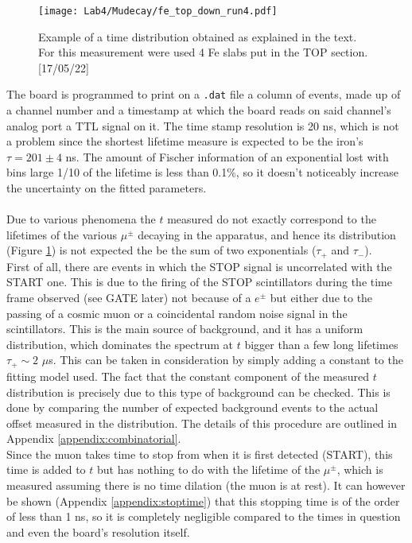\documentclass[10pt,a4paper,twocolumn]{article}
\begin{document}
\begin{figure}[h!]
\centering
\texttt{[image: Lab4/Mudecay/fe\_top\_down\_run4.pdf]} 
\caption{Example of a time distribution obtained as explained in the text. For this measurement were used 4 Fe slabs put in the TOP section. [17/05/22]}
\label{exampletdistr}
\end{figure}

The board is programmed to print on a \texttt{.dat} file a column of events, made up of a channel number and a timestamp at which the board reads on said channel's analog port a TTL signal on it. The time stamp resolution is 20 ns, which is not a problem since the shortest lifetime measure is expected to be the iron's $\tau=201 \pm 4$ ns. The amount of Fischer information of an exponential lost with bins large 1/10 of the lifetime is less than 0.1\%, so it doesn't noticeably increase the uncertainty on the fitted parameters.
\\
\\
Due to various phenomena the $t$ measured do not exactly correspond to the lifetimes of the various $\mu^\pm$ decaying in the apparatus, and hence its distribution (Figure \ref{exampletdistr}) is not expected the be the sum of two exponentials ($\tau_+$ and $\tau_-$).
\\
First of all, there are events in which the STOP signal is uncorrelated with the START one. This is due to the firing of the STOP scintillators during the time frame observed (see GATE later) not because of a $e^\pm$ but either due to the passing of a cosmic muon or a coincidental random noise signal in the scintillators. This is the main source of background, and it has a uniform distribution, which dominates the spectrum at $t$ bigger than a few long lifetimes $\tau_+\sim 2$ $\mu$s. This can be taken in consideration by simply adding a constant to the fitting model used. The fact that the constant component of the measured $t$ distribution is precisely due to this type of background can be checked. This is done by comparing the number of expected background events to the actual offset measured in the distribution. The details of this procedure are outlined in Appendix \ref{appendix:combinatorial}. 
\\
Since the muon takes time to stop from when it is first detected (START), this time is added to $t$ but has nothing to do with the lifetime of the $\mu^\pm$, which is measured assuming there is no time dilation (the muon is at rest). It can however be shown (Appendix \ref{appendix:stoptime}) that this stopping time is of the order of less than 1 ns, so it is completely negligible compared to the times in question and even the board's resolution itself.
\end{document}
